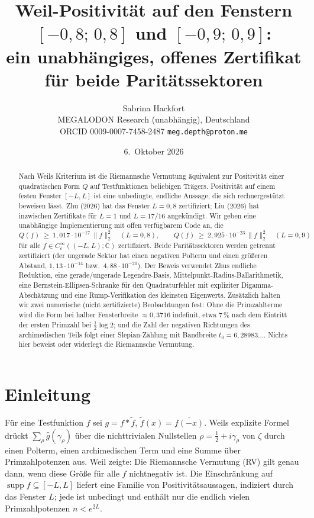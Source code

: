 \documentclass[11pt,a4paper]{article}
\title{Weil-Positivität auf den Fenstern $[-0{,}8;\,0{,}8]$ und $[-0{,}9;\,0{,}9]$:\\
ein unabhängiges, offenes Zertifikat für beide Paritätssektoren}
\author{Sabrina Hackfort\\[2pt]
\small MEGALODON Research (unabhängig), Deutschland\\
\small ORCID 0009-0007-7458-2487 \quad \texttt{meg.depth@proton.me}}
\date{6.~Oktober 2026}
\theoremstyle{definition}
\begin{document}
\maketitle

\begin{abstract}
Nach Weils Kriterium ist die Riemannsche Vermutung äquivalent zur Positivität einer quadratischen Form $Q$ auf Testfunktionen beliebigen Trägers. Positivität auf einem festen Fenster $[-L,L]$ ist eine unbedingte, endliche Aussage, die sich rechnergestützt beweisen lässt. Zhu (2026) hat das Fenster $L=0{,}8$ zertifiziert; Liu (2026) hat inzwischen Zertifikate für $L=1$ und $L=17/16$ angekündigt. Wir geben eine unabhängige Implementierung mit offen verfügbarem Code an, die
\[
Q(f)\ \ge\ 1{,}017\cdot10^{-17}\,\|f\|_2^2 \quad (L=0{,}8),\qquad
Q(f)\ \ge\ 2{,}925\cdot10^{-23}\,\|f\|_2^2 \quad (L=0{,}9)
\]
für alle $f\in C_c^\infty((-L,L);\mathbb C)$ zertifiziert. Beide Paritätssektoren werden getrennt zertifiziert (der ungerade Sektor hat einen negativen Polterm und einen größeren Abstand, $1{,}13\cdot10^{-14}$ bzw.\ $4{,}88\cdot10^{-20}$). Der Beweis verwendet Zhus endliche Reduktion, eine gerade/ungerade Legendre-Basis, Mittelpunkt-Radius-Ballarithmetik, eine Bernstein-Ellipsen-Schranke für den Quadraturfehler mit expliziter Digamma-Abschätzung und eine Rump-Verifikation des kleinsten Eigenwerts. Zusätzlich halten wir zwei numerische (nicht zertifizierte) Beobachtungen fest: Ohne die Primzahlterme wird die Form bei halber Fensterbreite $\approx0{,}3716$ indefinit, etwa $7\,\%$ nach dem Eintritt der ersten Primzahl bei $\tfrac12\log2$; und die Zahl der negativen Richtungen des archimedischen Teils folgt einer Slepian-Zählung mit Bandbreite $t_0=6{,}28983\ldots$. Nichts hier beweist oder widerlegt die Riemannsche Vermutung.
\end{abstract}

\section{Einleitung}

Für eine Testfunktion $f$ sei $g=f*\tilde f$, $\tilde f(x)=\overline{f(-x)}$. Weils explizite Formel drückt $\sum_\rho \hat g(\gamma_\rho)$ über die nichttrivialen Nullstellen $\rho=\tfrac12+i\gamma_\rho$ von $\zeta$ durch einen Polterm, einen archimedischen Term und eine Summe über Primzahlpotenzen aus. Weil \cite{Weil52} zeigte: Die Riemannsche Vermutung (RV) gilt genau dann, wenn diese Größe für alle $f$ nichtnegativ ist. Die Einschränkung auf $\operatorname{supp} f\subseteq[-L,L]$ liefert eine Familie von Positivitätsaussagen, indiziert durch das Fenster $L$; jede ist unbedingt und enthält nur die endlich vielen Primzahlpotenzen $n<e^{2L}$.
\end{document}
